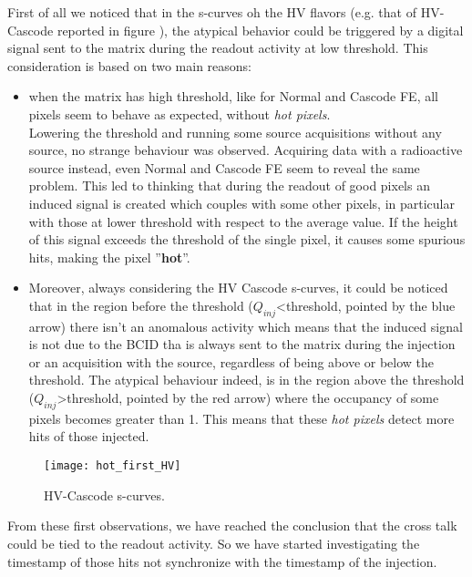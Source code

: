 First of all we noticed that in the s-curves oh the HV flavors (e.g. that of HV-Cascode reported in figure ), the atypical behavior could be triggered by a digital signal sent to the matrix during the readout activity at low threshold. This consideration is based on two main reasons:

\begin{itemize}
\item when the matrix has high threshold, like for Normal and Cascode FE, all pixels seem to behave as expected, without \textit{hot pixels}.\\ Lowering the threshold and running some source acquisitions without any source, no strange behaviour was observed. Acquiring data with a radioactive source instead, even Normal and Cascode FE seem to reveal the same problem. This led to thinking that during the readout of good pixels an induced signal is created which couples with some other pixels, in particular with those at lower threshold with respect to the average value. If the height of this signal exceeds the threshold of the single pixel, it causes some spurious hits, making the pixel ''\textbf{hot}''.

\item Moreover, always considering the HV Cascode s-curves, it could be noticed that in the region before the threshold ($Q_{inj}$<threshold, pointed by the blue arrow) there isn't an anomalous activity which means that the induced signal is not due to the BCID tha is always sent to the matrix during the injection or an acquisition with the source, regardless of being above or below the  threshold. The atypical behaviour indeed, is in the region above the threshold ($Q_{inj}$>threshold, pointed by the red arrow) where the occupancy of some pixels becomes greater than 1. This means that these \textit{hot pixels} detect more hits of those injected.

\end{itemize} 

\begin{figure}[h!]
\centering
\texttt{[image: hot\_first\_HV]}
\caption{HV-Cascode s-curves.}
\label{fig:hot_first}
\end{figure}

From these first observations, we have reached the conclusion that the cross talk could be tied to the readout activity. So we have started investigating the timestamp of those hits not synchronize with the timestamp of the injection.


